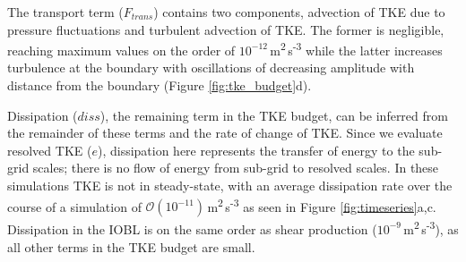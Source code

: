 \documentclass[draft]{styles/agujournal2019}
\begin{document}
The transport term ($F_{trans}$) contains two components, advection of TKE due to pressure fluctuations and turbulent advection of TKE. The former is negligible, reaching maximum values on the order of $10^{-12}$\,m\textsuperscript{2}\,s\textsuperscript{-3} while the latter increases turbulence at the boundary with oscillations of decreasing amplitude with distance from the boundary (Figure \ref{fig:tke_budget}d). 

Dissipation ($diss$), the remaining term in the TKE budget, can be inferred from the remainder of these terms and the rate of change of TKE. Since we evaluate resolved TKE ($e$), dissipation here represents the transfer of energy to the sub-grid scales; there is no flow of energy from sub-grid to resolved scales. In these simulations TKE is not in steady-state, with an average  dissipation rate over the course of a simulation of $\mathcal{O}(10^{-11})$\,m\textsuperscript{2}\,s\textsuperscript{-3} as seen in Figure \ref{fig:timeseries}a,c. Dissipation in the IOBL is on the same order as shear production ($10^{-9}$\,m\textsuperscript{2}\,s\textsuperscript{-3}), as all other terms in the TKE budget are small. 
\end{document}
